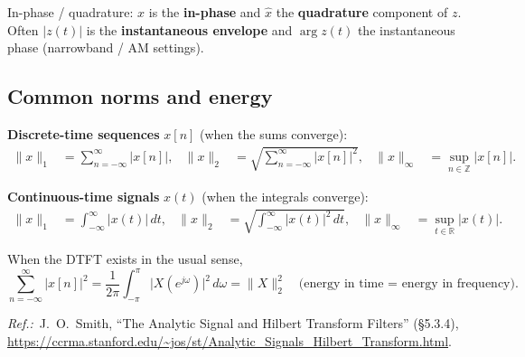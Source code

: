 \noindent\smallskip
\noindent\small In-phase / quadrature: $x$ is the \textbf{in-phase} and $\hat{x}$ the \textbf{quadrature} component of $z$. Often $|z(t)|$ is the \textbf{instantaneous envelope} and $\arg z(t)$ the instantaneous phase (narrowband / AM settings).

\subsection*{Common norms and energy}

\noindent\textbf{Discrete-time sequences} $x[n]$ (when the sums converge):
\begin{align*}
\|x\|_1 &= \sum_{n=-\infty}^{\infty} |x[n]|, &
\|x\|_2 &= \sqrt{\sum_{n=-\infty}^{\infty}|x[n]|^2}, &
\|x\|_\infty &= \sup_{n\in\mathbb{Z}} |x[n]|.
\end{align*}

\noindent\textbf{Continuous-time signals} $x(t)$ (when the integrals converge):
\begin{align*}
\|x\|_1 &= \int_{-\infty}^{\infty}|x(t)|\,dt, &
\|x\|_2 &= \sqrt{\int_{-\infty}^{\infty}|x(t)|^2\,dt}, &
\|x\|_\infty &= \sup_{t\in\mathbb{R}} |x(t)|.
\end{align*}

\begin{factbox}[title={Parseval (DTFT)}]
When the DTFT exists in the usual sense,
\begin{equation*}
\sum_{n=-\infty}^{\infty}|x[n]|^2
= \frac{1}{2\pi}\int_{-\pi}^{\pi}\bigl|X(e^{j\omega})\bigr|^2\,d\omega
= \|X\|_2^2 \quad \text{(energy in time = energy in frequency).}
\end{equation*}
\end{factbox}

\noindent\small\textit{Ref.:}\ J.\ O.\ Smith, ``The Analytic Signal and Hilbert Transform Filters'' (\S5.3.4), \url{https://ccrma.stanford.edu/~jos/st/Analytic_Signals_Hilbert_Transform.html}.
